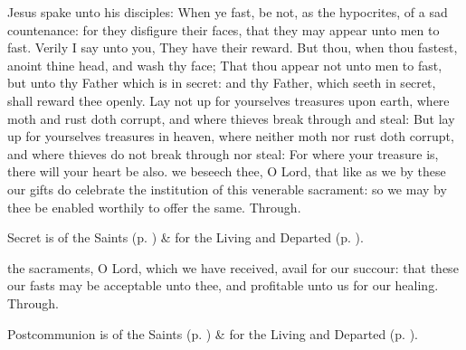  Jesus spake unto his disciples: When ye fast, be not, as the hypocrites, of a sad countenance: for they disfigure their faces, that they may appear unto men to fast. Verily I say unto you, They have their reward. But thou, when thou fastest, anoint thine head, and wash thy face; That thou appear not unto men to fast, but unto thy Father which is in secret: and thy Father, which seeth in secret, shall reward thee openly. Lay not up for yourselves treasures upon earth, where moth and rust doth corrupt, and where thieves break through and steal: But lay up for yourselves treasures in heaven, where neither moth nor rust doth corrupt, and where thieves do not break through nor steal: For where your treasure is, there will your heart be also.
\secret\label{AshWednesdayMassSecret}
 we beseech thee, O Lord, that like as we by these our gifts do celebrate the institution of this venerable sacrament: so we may by thee be enabled worthily to offer the same. Through.
\begin{rubric}
     Secret is of the Saints (p. \pageref{SPSaints}) \&  for the Living and Departed (p. \pageref{SPLivingDeparted}).
\end{rubric}
\postcommunion\label{AshWednesdayMassPostcommunion}
 the sacraments, O Lord, which we have received, avail for our succour: that these our fasts may be acceptable unto thee, and profitable unto us for our healing. Through.
\begin{rubric}
     Postcommunion is of the Saints (p. \pageref{SPSaints}) \&  for the Living and Departed (p. \pageref{SPLivingDeparted}).
\end{rubric}

